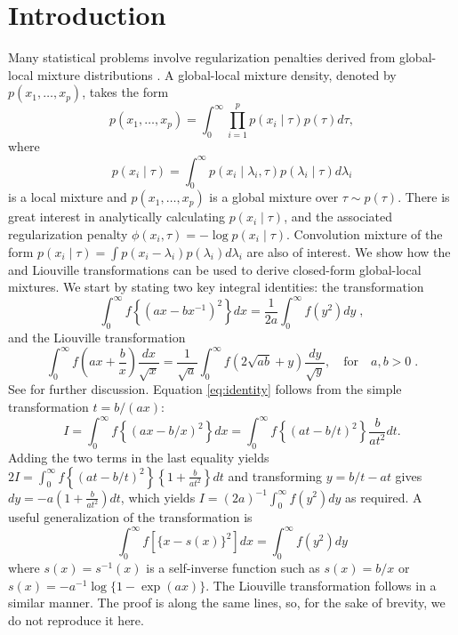 \documentclass[lineno]{biometrika}
\begin{document}
\section{Introduction}
Many statistical problems involve regularization penalties derived from global-local mixture distributions \citep{polson_data_2011, hans2011comment,bhadra2015horseshoe+}. A global-local mixture density, denoted by $p(x_1, \ldots, x_p)$, takes the form 
\begin{equation*}
p(x_1, \ldots, x_p) = \int_{0}^{\infty}\prod_{i=1}^{p}  p(x_i \mid \tau) 
p(\tau) d\tau, 
\end{equation*}
where 
$$
p(x_i \mid \tau) = \int_{0}^{\infty} p(x_i \mid \lambda_i, \tau) 
p(\lambda_i \mid \tau) d\lambda_i
$$ 
is a local mixture and $p(x_1, \ldots, x_p)$ is a global mixture over 
$\tau \sim p(\tau)$. There is great interest in analytically calculating 
$p(x_i \mid \tau)$, and the associated regularization penalty 
$\phi(x_i, \tau) = -\log p(x_i \mid \tau)$.  Convolution mixture of the form 
$p(x_i \mid \tau) = \int p(x_i - \lambda_i) p(\lambda_i) d \lambda_i$ 
are also of interest. We show how the \CS{} and Liouville transformations can
be used to derive closed-form global-local mixtures.  We start by stating two
key integral identities: 
the \CS{} transformation 
\begin{equation}
  \int_0^\infty f \left\{ ( a x - b x^{-1} )^2 \right\} d x 
  = \frac{1}{2a} \int_0^\infty f(y^2) d y
  \;, 
  \label{eq:identity}
\end{equation}
and the Liouville transformation
\begin{equation}
  \int_{0}^{\infty} f\left(ax + \frac{b}{x} \right) \frac{dx}{\sqrt{x}} 
  = \frac{1}{\sqrt{a}} \int_{0}^{\infty} f\left( 2\sqrt{ab} + y \right) 
  \frac{dy}{\sqrt{y}}, \quad\text{for}\quad a, b >0
  \;. 
  \label{eq:liouville}
\end{equation}
See \cite{boros2006irresistible, baker2008probabilistic,
amdeberhan_cauchy-schlomilch_2010, jones_generating_2014} for further
discussion.  
Equation \eqref{eq:identity} follows from the simple transformation $t = b/(a x)$: 
\begin{equation*}
  I = \int_{0}^{\infty} f \left\{(ax - b/x)^2 \right\} dx 
  = \int_{0}^{\infty} f \left\{(at - b/t)^2 \right\} \frac{b}{a t^2} dt.
\end{equation*}
Adding the two terms in the last equality yields 
$2 I = \int_{0}^{\infty} f \left\{(at - b/t)^2 \right\} \left\{ 1+\frac{b}{a t^2} \right\} dt$ 
and transforming $y = b/t - at$ gives $dy = -a (1+\frac{b}{a t^2}) dt$, which yields 
$I = (2a)^{-1} \int_{0}^{\infty} f(y^2) dy$ as required. A useful generalization
of the \CS{} transformation is
\begin{equation}
  \int_0^\infty f \left[ \{x-s(x)\}^2 \right] dx = 
  \int_0^\infty f( y^2 ) dy 
  \label{eq:gen}
\end{equation}
where $s(x)=s^{-1}(x)$ is a self-inverse function such as $s(x) = b/x$ or 
$s(x) = -a^{-1}\log\{1-\exp(a x)\}$. The Liouville transformation follows in a
similar manner.  The proof is along the same lines, so, for the sake
of brevity, we do not reproduce it here. 
\end{document}
